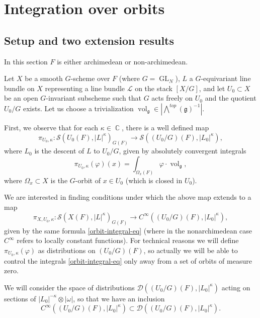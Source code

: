 \documentclass[12pt,reqno]{amsart}
\DeclareMathOperator\C{\mathbb C}
\theoremstyle{definition}
\theoremstyle{remark}
\numberwithin{equation}{section}
\newcommand{\ot}{\otimes}
\newcommand{\Om}{\Omega}
\newcommand{\DD}{{\mathcal D}}
\renewcommand{\SS}{{\mathcal S}}
\newcommand{\LL}{{\mathcal L}}
\newcommand{\sub}{\subset}
\newcommand{\om}{\omega}
\newcommand{\GL}{\operatorname{GL}}
\newcommand{\fg}{{\mathfrak g}}
\newcommand{\vol}{{\operatorname{vol}}}
\begin{document}
\section{Integration over orbits}\label{orbit-int-sec}

\subsection{Setup and two extension results}\label{integration-ext-sec}

In this section $F$ is either archimedean or non-archimedean.

Let $X$ be a smooth $G$-scheme over $F$  (where $G=\GL_N$), $L$ a $G$-equivariant line bundle
on $X$ representing a line bundle $\LL$ on the stack $[X/G]$, and let $U_0\sub X$ be an open $G$-invariant subscheme such that $G$ acts freely on $U_0$ and
the quotient $U_0/G$ exists. Let us choose a trivialization 
$\vol_{\fg}\in |{\bigwedge}^{top}(\fg)^{-1}|$.


First, we observe that for each $\kappa\in\C$,
there is a well defined map
$$\pi_{U_0,\kappa}:\SS(U_0(F),|L|^{\kappa})_{G(F)}\to \SS((U_0/G)(F),|L_0|^{\kappa}),$$
where $L_0$ is the descent of $L$ to $U_0/G$,
given by absolutely convergent integrals
\begin{equation}\label{orbit-integral-eq}
\pi_{U_0,\kappa}(\varphi)(x)=\int_{\Om_x(F)} \varphi\cdot \vol_{\fg},
\end{equation}
where $\Om_x\sub X$ is the $G$-orbit of $x\in U_0$ (which is closed in $U_0$).

We are interested in finding conditions under which the above map extends to a map
\begin{equation}\label{lc-kappa-map}
\pi_{X,U_0,\kappa}:\SS(X(F),|L|^{\kappa})_{G(F)}\to C^\infty((U_0/G)(F),|L_0|^{\kappa}),
\end{equation}
given by the same formula \eqref{orbit-integral-eq}
(where in the nonarchimedean case $C^\infty$ refers to locally constant functions).
For technical reasons we will define $\pi_{U_0,\kappa}(\varphi)$ as distributions on $(U_0/G)(F)$, so actually
we will be able to control the integrals \eqref{orbit-integral-eq} only away from a set of orbits of measure zero.

We will consider the space of distributions $\DD((U_0/G)(F),|L_0|^{\kappa})$ acting on sections of $|L_0|^{-\kappa}\ot |\om|$,
so that we have an inclusion 
$$C^\infty((U_0/G)(F),|L_0|^{\kappa})\sub \DD((U_0/G)(F),|L_0|^{\kappa}).$$
\end{document}
